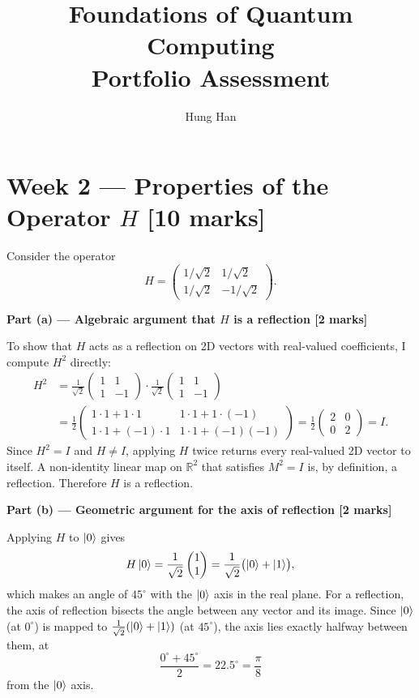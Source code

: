 \documentclass[12pt,a4paper]{article}
\title{\textbf{Foundations of Quantum Computing}\\[0.5em]
       \large Portfolio Assessment}
\author{Hung Han}
\date{}
\begin{document}
\maketitle
\thispagestyle{empty}

\section*{Week 2 --- Properties of the Operator $H$ [10 marks]}

Consider the operator
\[
  H = \begin{pmatrix} 1/\sqrt{2} & 1/\sqrt{2} \\ 1/\sqrt{2} & -1/\sqrt{2} \end{pmatrix}.
\]

\medskip
\textbf{Part (a) --- Algebraic argument that $H$ is a reflection [2 marks]}

\medskip
To show that $H$ acts as a reflection on 2D vectors with real-valued coefficients, I compute $H^2$ directly:
\begin{align*}
H^2
  &= \frac{1}{\sqrt{2}}\begin{pmatrix}1&1\\1&-1\end{pmatrix}
     \cdot\frac{1}{\sqrt{2}}\begin{pmatrix}1&1\\1&-1\end{pmatrix} \\[4pt]
  &= \frac{1}{2}\begin{pmatrix}1{\cdot}1+1{\cdot}1 & 1{\cdot}1+1{\cdot}(-1)\\
                               1{\cdot}1+(-1){\cdot}1 & 1{\cdot}1+(-1)(-1)\end{pmatrix}
   = \frac{1}{2}\begin{pmatrix}2&0\\0&2\end{pmatrix}
   = I.
\end{align*}
Since $H^2 = I$ and $H\neq I$, applying $H$ twice returns every real-valued 2D vector to itself. A non-identity linear map on $\mathbb{R}^2$ that satisfies $M^2 = I$ is, by definition, a reflection. Therefore $H$ is a reflection.

\medskip
\textbf{Part (b) --- Geometric argument for the axis of reflection [2 marks]}

\medskip
Applying $H$ to $\ket{0}$ gives
\[
  H\ket{0} = \frac{1}{\sqrt{2}}\begin{pmatrix}1\\1\end{pmatrix}
           = \frac{1}{\sqrt{2}}\bigl(\ket{0}+\ket{1}\bigr),
\]
which makes an angle of $45^\circ$ with the $\ket{0}$ axis in the real plane.
For a reflection, the axis of reflection bisects the angle between any vector and its image.
Since $\ket{0}$ (at $0^\circ$) is mapped to $\tfrac{1}{\sqrt{2}}(\ket{0}+\ket{1})$ (at $45^\circ$), the axis lies exactly halfway between them, at
\[
  \frac{0^\circ + 45^\circ}{2} = 22.5^\circ = \frac{\pi}{8}
\]
from the $\ket{0}$ axis.
\end{document}
